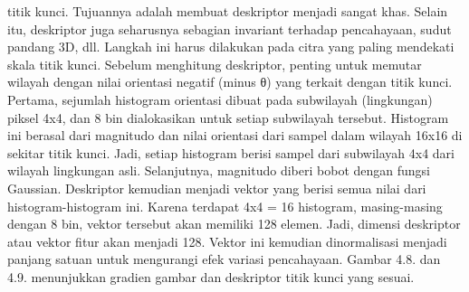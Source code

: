 \documentclass[
  letterpaper,
  DIV=11,
  numbers=noendperiod]{scrreprt}
\begin{document}
\begin{itemize}
  titik kunci. Tujuannya adalah membuat deskriptor menjadi sangat khas.
  Selain itu, deskriptor juga seharusnya sebagian invariant terhadap
  pencahayaan, sudut pandang 3D, dll. Langkah ini harus dilakukan pada
  citra yang paling mendekati skala titik kunci. Sebelum menghitung
  deskriptor, penting untuk memutar wilayah dengan nilai orientasi
  negatif (minus θ) yang terkait dengan titik kunci.\\
  Pertama, sejumlah histogram orientasi dibuat pada subwilayah
  (lingkungan) piksel 4x4, dan 8 bin dialokasikan untuk setiap
  subwilayah tersebut. Histogram ini berasal dari magnitudo dan nilai
  orientasi dari sampel dalam wilayah 16x16 di sekitar titik kunci.
  Jadi, setiap histogram berisi sampel dari subwilayah 4x4 dari wilayah
  lingkungan asli. Selanjutnya, magnitudo diberi bobot dengan fungsi
  Gaussian. Deskriptor kemudian menjadi vektor yang berisi semua nilai
  dari histogram-histogram ini. Karena terdapat 4x4 = 16 histogram,
  masing-masing dengan 8 bin, vektor tersebut akan memiliki 128 elemen.
  Jadi, dimensi deskriptor atau vektor fitur akan menjadi 128. Vektor
  ini kemudian dinormalisasi menjadi panjang satuan untuk mengurangi
  efek variasi pencahayaan. Gambar 4.8. dan 4.9. menunjukkan gradien
  gambar dan deskriptor titik kunci yang sesuai.
\end{itemize}
\end{document}
